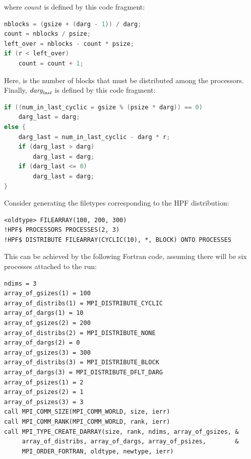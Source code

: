 where $count$ is defined by this code fragment:
\begin{lstlisting}[language=C]
nblocks = (gsize + (darg - 1)) / darg;
count = nblocks / psize;
left_over = nblocks - count * psize;
if (r < left_over)
    count = count + 1;
\end{lstlisting}
Here,  is the number of blocks that must be
distributed among the processors.
Finally, $\textrm{\itshape{darg}}_{\textrm{\itshape{\scriptsize last}}}$ is defined by this code fragment:
\begin{lstlisting}[language=C]
if ((num_in_last_cyclic = gsize % (psize * darg)) == 0)
    darg_last = darg;
else {
    darg_last = num_in_last_cyclic - darg * r;
    if (darg_last > darg)
        darg_last = darg;
    if (darg_last <= 0)
        darg_last = darg;
}
\end{lstlisting}

\begin{example}
Consider generating the filetypes corresponding to the HPF distribution:
\label{ex:io-hpf}
%
%
\begin{lstlisting}[language={[HPF]Fortran}]
      <oldtype> FILEARRAY(100, 200, 300)
!HPF$ PROCESSORS PROCESSES(2, 3)
!HPF$ DISTRIBUTE FILEARRAY(CYCLIC(10), *, BLOCK) ONTO PROCESSES
\end{lstlisting}
This can be achieved by the following Fortran code,
assuming there will be six processes attached to the run:
\begin{lstlisting}[language={[MPI]Fortran}]
ndims = 3
array_of_gsizes(1) = 100
array_of_distribs(1) = MPI_DISTRIBUTE_CYCLIC
array_of_dargs(1) = 10
array_of_gsizes(2) = 200
array_of_distribs(2) = MPI_DISTRIBUTE_NONE
array_of_dargs(2) = 0
array_of_gsizes(3) = 300
array_of_distribs(3) = MPI_DISTRIBUTE_BLOCK
array_of_dargs(3) = MPI_DISTRIBUTE_DFLT_DARG
array_of_psizes(1) = 2
array_of_psizes(2) = 1
array_of_psizes(3) = 3
call MPI_COMM_SIZE(MPI_COMM_WORLD, size, ierr)
call MPI_COMM_RANK(MPI_COMM_WORLD, rank, ierr)
call MPI_TYPE_CREATE_DARRAY(size, rank, ndims, array_of_gsizes, &
     array_of_distribs, array_of_dargs, array_of_psizes,        &
     MPI_ORDER_FORTRAN, oldtype, newtype, ierr)
\end{lstlisting}
\end{example}


